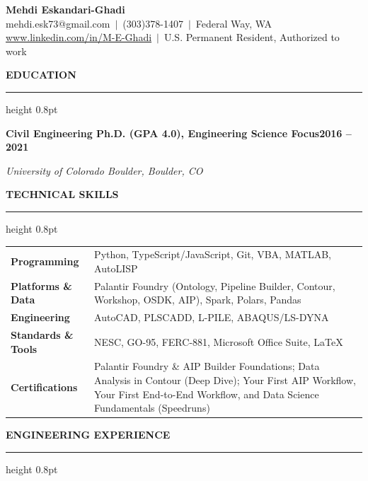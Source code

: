 \documentclass[10pt, letterpaper]{article}
\newcommand{\rsection}[1]{%
  \vspace{8pt}%
  {\large\bfseries\MakeUppercase{#1}}%
  \vspace{1pt}%
  \hrule height 0.8pt%
  \vspace{4pt}%
}
\newcommand{\jobline}[2]{%
  \vspace{5pt}%
  \noindent\textbf{#1}\hfill\textbf{#2}\par%
  \vspace{1pt}%
}
\newcommand{\subline}[1]{%
  \vspace{-1pt}%
  \noindent\textit{#1}\par%
  \vspace{1pt}%
}
\begin{document}
\pagestyle{empty}

\begin{center}
  {\LARGE\bfseries Mehdi Eskandari-Ghadi}\\[4pt]
  mehdi.esk73@gmail.com\ $|$\ (303)378-1407\ $|$\ Federal Way, WA\\[2pt]
  \href{http://www.linkedin.com/in/M-E-Ghadi}{www.linkedin.com/in/M-E-Ghadi}\ $|$\
  U.S. Permanent Resident, Authorized to work
\end{center}

\vspace{2pt}

\rsection{Education}

\jobline{Civil Engineering Ph.D. (GPA 4.0), Engineering Science Focus}{2016 -- 2021}
\subline{University of Colorado Boulder, Boulder, CO}

\rsection{Technical Skills}

\vspace{2pt}
\begin{tabular}{@{}p{3.4cm}p{14.4cm}@{}}
  \textbf{Programming}       & Python, TypeScript/JavaScript, Git, VBA, MATLAB, AutoLISP \\[2pt]
  \textbf{Platforms \& Data} & Palantir Foundry (Ontology, Pipeline Builder, Contour, Workshop, OSDK, AIP), Spark, Polars, Pandas \\[2pt]
  \textbf{Engineering}       & AutoCAD, PLSCADD, L-PILE, ABAQUS/LS-DYNA \\[2pt]
  \textbf{Standards \& Tools} & NESC, GO-95, FERC-881, Microsoft Office Suite, LaTeX \\[2pt]
  \textbf{Certifications}    & Palantir Foundry \& AIP Builder Foundations; Data Analysis in Contour (Deep Dive); Your First AIP Workflow, Your First End-to-End Workflow, and Data Science Fundamentals (Speedruns) \\
\end{tabular}

\rsection{Engineering Experience}
\end{document}
